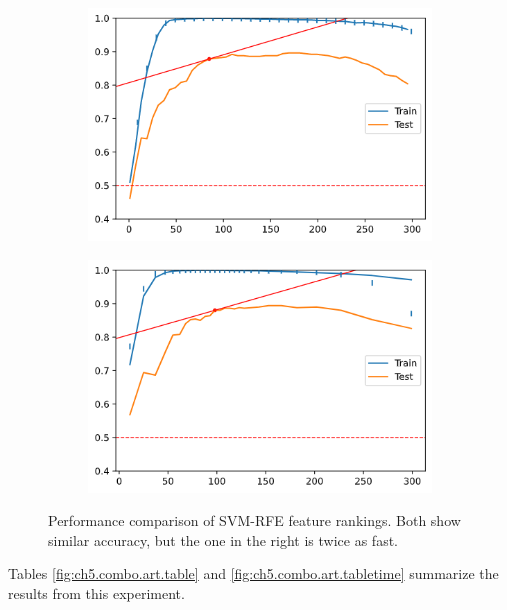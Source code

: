 \begin{figure}[H]
    \centering
    \begin{subfigure}[b]{0.4\linewidth}
        \includegraphics[width=\linewidth]{img/ch5/kernel/art_poly.png}
    \end{subfigure}
    \begin{subfigure}[b]{0.4\linewidth}
        \includegraphics[width=\linewidth]{img/ch5/combo/twice.png}
    \end{subfigure}
    \caption[Combo: Comparison with artificial data]{Performance comparison of SVM-RFE feature rankings. Both show similar accuracy, but the one in the right is twice as fast.}
    \label{fig:ch5.combo.art.comp}
\end{figure}

Tables \ref{fig:ch5.combo.art.table} and \ref{fig:ch5.combo.art.tabletime} summarize the results from this experiment.

